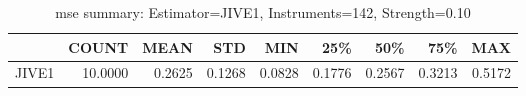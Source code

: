 \begin{table}[ht]
\centering
\caption{mse summary: Estimator=JIVE1, Instruments=142, Strength=0.10}
\begin{tabular}{lrrrrrrrr}
\toprule
 & COUNT & MEAN & STD & MIN & 25\% & 50\% & 75\% & MAX \\
\midrule
JIVE1 & 10.0000 & 0.2625 & 0.1268 & 0.0828 & 0.1776 & 0.2567 & 0.3213 & 0.5172 \\
\bottomrule
\end{tabular}
\end{table}
